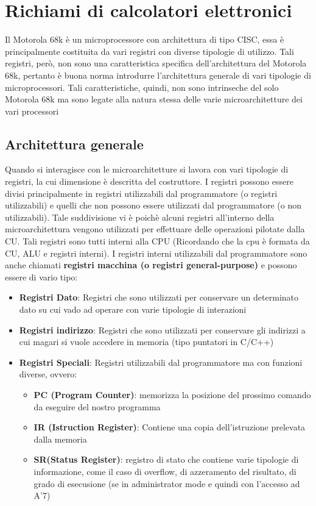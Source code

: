  \section{Richiami di calcolatori elettronici}
Il Motorola 68k è un microprocessore con architettura di tipo CISC, essa è principalmente costituita da vari registri con diverse tipologie di utilizzo. Tali registri, però, non sono una caratteristica specifica dell'architettura del Motorola 68k, pertanto è buona norma introdurre l'architettura generale di vari tipologie di microprocessori. Tali caratteristiche, quindi, non sono intrinseche del solo Motorola 68k ma sono legate alla natura stessa delle varie microarchitetture dei vari processori

\subsection{Architettura generale}
Quando si interagisce con le microarchitetture si lavora con vari tipologie di registri, la cui dimensione è descritta del costruttore.
I registri possono essere divisi principalmente in registri utilizzabili dal programmatore (o registri utilizzabili) e quelli che non possono essere utilizzati dal programmatore (o non utilizzabili). Tale suddivisione vi è poichè alcuni registri all'interno della microarchitettura vengono utilizzati per effettuare delle operazioni pilotate dalla CU. Tali registri sono tutti interni alla CPU (Ricordando che la cpu è formata da CU, ALU e registri interni). I registri interni utilizzabili dal programmatore sono anche chiamati \textbf{registri macchina (o registri general-purpose)} e possono essere di vario tipo:

\begin{itemize}
    \item \textbf{Registri Dato}: Registri che sono utilizzati per conservare un determinato dato su cui vado ad operare con varie tipologie di interazioni
    \item \textbf{Registri indirizzo}: Registri che sono utilizzati per conservare gli indirizzi a cui magari si vuole accedere in memoria (tipo puntatori in C/C++)
    \item \textbf{Registri Speciali}: Registri utilizzabili dal programmatore ma con funzioni diverse, ovvero:
    \begin{itemize}
        \item \textbf{PC (Program Counter)}: memorizza la posizione del prossimo comando da eseguire del nostro programma
        \item \textbf{IR (Istruction Register)}: Contiene una copia dell'istruzione prelevata dalla memoria
        \item \textbf{SR(Status Register)}: registro di stato che contiene varie tipologie di informazione, come il caso di overflow, di azzeramento del risultato, di grado di esecusione (se in administrator mode e quindi con l'accesso ad A'7)
    \end{itemize}
\end{itemize}

